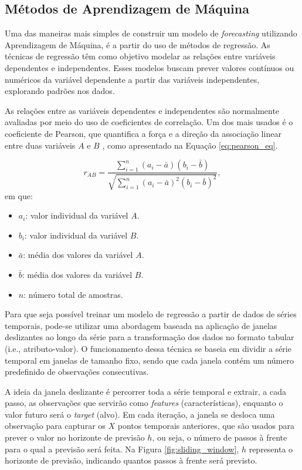 \subsection{Métodos de Aprendizagem de Máquina}

Uma das maneiras mais simples de construir um modelo de \textit{forecasting} utilizando Aprendizagem de Máquina, é a partir do uso de métodos de regressão. As técnicas de regressão têm como objetivo modelar as relações entre variáveis dependentes e independentes. Esses modelos buscam prever valores contínuos ou numéricos da variável dependente a partir das variáveis independentes, explorando padrões nos dados.

As relações entre as variáveis dependentes e independentes são normalmente avaliadas por meio do uso de coeficientes de correlação. Um dos mais usados é o coeficiente de Pearson, que quantifica a força e a direção da associação linear entre duas variáveis $A$ e $B$ \citep{kirchgassner2007}, como apresentado na Equação \eqref{eq:pearson_eq}.

\begin{equation}
r_{AB} = \frac{\sum_{i=1}^{n} (a_i - \bar{a})(b_i - \bar{b})}{\sqrt{\sum_{i=1}^{n} (a_i - \bar{a})^2 (b_i - \bar{b})^2}},
\label{eq:pearson_eq}
\end{equation}
em que:
\begin{itemize}
    \item \( a_i \): valor individual da variável \( A \).
    \item \( b_i \): valor individual da variável \( B \).
    \item \( \bar{a} \): média dos valores da variável \( A \).
    \item \( \bar{b} \): média dos valores da variável \( B \).
    \item \( n \): número total de amostras.
\end{itemize}


Para que seja possível treinar um modelo de regressão a partir de dados de séries temporais, pode-se utilizar uma abordagem baseada na aplicação de janelas deslizantes ao longo da série para a transformação dos dados no formato tabular (i.e., atributo-valor). O funcionamento dessa técnica se baseia em dividir a série temporal em janelas de tamanho fixo, sendo que cada janela contém um número predefinido de observações consecutivas. 

A ideia da janela deslizante é percorrer toda a série temporal e extrair, a cada passo, as observações que servirão como \textit{features} (características), enquanto o valor futuro será o \textit{target} (alvo). Em cada iteração, a janela se desloca uma observação para capturar os \(X\) pontos temporais anteriores, que são usados para prever o valor no horizonte de previsão \(h\), ou seja, o número de passos à frente para o qual a previsão será feita. Na Figura \ref{fig:sliding_window}, \(h\) representa o horizonte de previsão, indicando quantos passos à frente será previsto.

